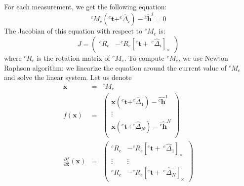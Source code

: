 \documentclass {article}
\newcommand\transf[2]{^{#1}M_{#2}}
\newcommand\linvel{\mathbf{v}}
\newcommand\angvel{\omega}
\newcommand\cross[1]{\left[#1\right]_{\times}}
\newcommand\x{\mathbf{x}}
\newcommand\hole{\mathbf{h}}
\newcommand\tool{\mathbf{t}}
\begin{document}
For each measurement, we get the following equation:
$$
\transf{c}{e}(^e\tool + ^{e}\hat{\Delta}_i) - \hat{^{c}\hole}^i = 0
$$
The Jacobian of this equation with respect to $\transf{c}{e}$ is:
$$
J = \left(\begin{array}{cc} ^{c}R_{e}& -^{c}R_{e}\cross{^e\tool +\ ^{e}\hat{\Delta}_i}\end{array}\right)
$$
where $^{c}R_{e}$ is the rotation matrix of $\transf{c}{e}$.
To compute $\transf{c}{e}$, we use Newton Raphson algorithm: we linearize the
equation around the current value of $\transf{c}{e}$ and solve the linear
system. Let us denote
\begin{eqnarray*}
  \x &=& \transf{c}{e} \\
  f(\x) &=& \left(\begin{array}{c}
    \x(^e\tool + ^{e}\hat{\Delta}_1) - \hat{^{c}\hole}^1\\
    \vdots\\
    \x(^e\tool + ^{e}\hat{\Delta}_N) - \hat{^{c}\hole}^N\\
    \end{array}\right) \\
    \frac{\partial f}{\partial \x}(\x) &=&
    \left(\begin{array}{cc}
      ^{c}R_{e} & -^{c}R_{e}\cross{^e\tool +\ ^{e}\hat{\Delta}_1}\\
      \vdots & \vdots \\
      ^{c}R_{e} & -^{c}R_{e}\cross{^e\tool +\ ^{e}\hat{\Delta}_N}
    \end{array}\right)
\end{eqnarray*}
\end{document}
